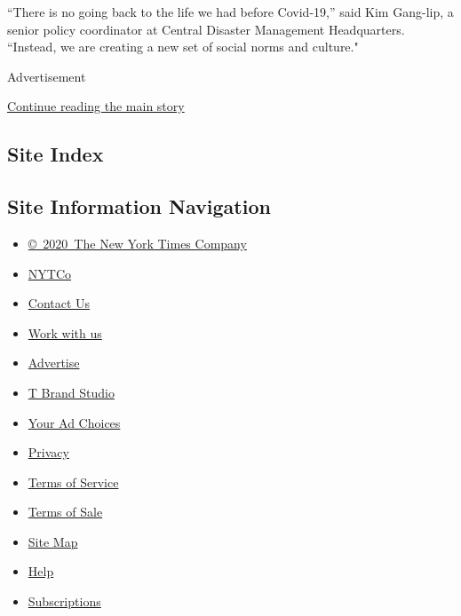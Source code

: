 ``There is no going back to the life we had before Covid-19,'' said Kim
Gang-lip, a senior policy coordinator at Central Disaster Management
Headquarters. ``Instead, we ​are creating a new set of social norms and
culture."

Advertisement

\protect\hyperlink{after-bottom}{Continue reading the main story}

\hypertarget{site-index}{%
\subsection{Site Index}\label{site-index}}

\hypertarget{site-information-navigation}{%
\subsection{Site Information
Navigation}\label{site-information-navigation}}

\begin{itemize}
\tightlist
\item
  \href{https://help.nytimes3xbfgragh.onion/hc/en-us/articles/115014792127-Copyright-notice}{©~2020~The
  New York Times Company}
\end{itemize}

\begin{itemize}
\tightlist
\item
  \href{https://www.nytco.com/}{NYTCo}
\item
  \href{https://help.nytimes3xbfgragh.onion/hc/en-us/articles/115015385887-Contact-Us}{Contact
  Us}
\item
  \href{https://www.nytco.com/careers/}{Work with us}
\item
  \href{https://nytmediakit.com/}{Advertise}
\item
  \href{http://www.tbrandstudio.com/}{T Brand Studio}
\item
  \href{https://www.nytimes3xbfgragh.onion/privacy/cookie-policy\#how-do-i-manage-trackers}{Your
  Ad Choices}
\item
  \href{https://www.nytimes3xbfgragh.onion/privacy}{Privacy}
\item
  \href{https://help.nytimes3xbfgragh.onion/hc/en-us/articles/115014893428-Terms-of-service}{Terms
  of Service}
\item
  \href{https://help.nytimes3xbfgragh.onion/hc/en-us/articles/115014893968-Terms-of-sale}{Terms
  of Sale}
\item
  \href{https://spiderbites.nytimes3xbfgragh.onion}{Site Map}
\item
  \href{https://help.nytimes3xbfgragh.onion/hc/en-us}{Help}
\item
  \href{https://www.nytimes3xbfgragh.onion/subscription?campaignId=37WXW}{Subscriptions}
\end{itemize}
